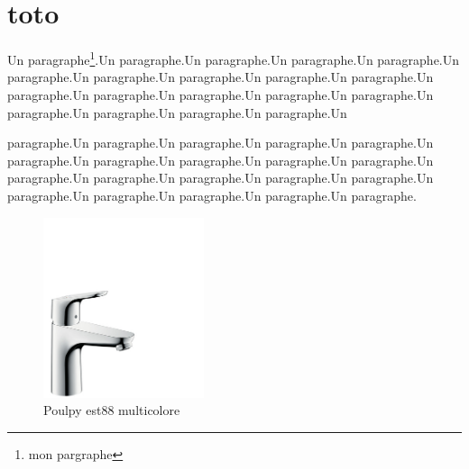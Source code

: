 \documentclass[10pt,twocolumn]{article}
\author{jd}
\begin{document}


\section{toto}

Un paragraphe\footnote{mon pargraphe}.Un paragraphe.Un paragraphe.Un paragraphe.Un paragraphe.Un paragraphe.Un paragraphe.Un paragraphe.Un paragraphe.Un paragraphe.Un paragraphe.Un paragraphe.Un paragraphe.Un paragraphe.Un paragraphe.Un paragraphe.Un paragraphe.Un paragraphe.Un paragraphe.Un \begin{tiny}
paragraphe.Un paragraphe.Un paragraphe.Un paragraphe.Un paragraphe.Un paragraphe.Un paragraphe.Un paragraphe.Un paragraphe.Un paragraphe.Un paragraphe.Un paragraphe.Un paragraphe.Un paragraphe.Un paragraphe.Un paragraphe.Un paragraphe.Un paragraphe.Un paragraphe.Un paragraphe.
\end{tiny}

\begin{figure}[ht]
\begin{center}
\includegraphics[height=200px]{images/mitigeur_hansgrohe.jpg} 
\caption{Poulpy est88 multicolore}

\label{fstsdf} 
\end{center}
\end{figure}
\end{document}
